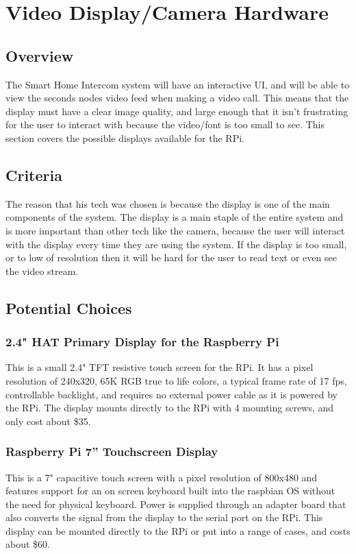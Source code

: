 \documentclass[onecolumn, draftclsnofoot,10pt, compsoc]{IEEEtran}
\begin{document}
\section{Video Display/Camera Hardware}

\subsection{Overview}
 The Smart Home Intercom system will have an interactive UI, and will be able to view the seconds nodes video feed when making a video call. 
 This means that the display must have a clear image quality, and large enough that it isn't frustrating for the user to interact with because the video/font is too small to see. 
 This section covers the possible displays available for the RPi.

\subsection{Criteria}
 The reason that his tech was chosen is because the display is one of the main components of the system. The display is a main staple of the entire system and is more important than other tech like the camera, because the user will interact with the display every time they are using the system. If the display is too small, or to low of resolution then it will be hard for the user to read text or even see the video stream.

\subsection{Potential Choices}


\subsubsection{2.4" HAT Primary Display for the Raspberry Pi}
This is a small 2.4" TFT resistive touch screen for the RPi. It has a pixel resolution of 240x320, 65K RGB true to life colors, a typical frame rate of 17 fps, controllable backlight, and requires no external power cable as it is powered by the RPi. The display mounts directly to the RPi with 4 mounting screws, and only cost about \$35.



\subsubsection{Raspberry Pi 7” Touchscreen Display}
This is a 7" capacitive touch screen with a pixel resolution of 800x480 and features support for an on screen keyboard built into the raspbian OS without the need for physical keyboard. Power is supplied through an adapter board that also converts the signal from the display to the serial port on the RPi. This display can be mounted directly to the RPi or put into a range of cases, and costs about \$60.
\end{document}
